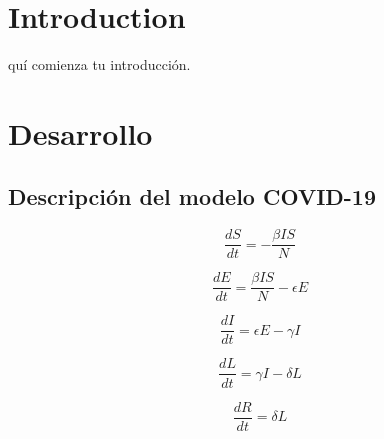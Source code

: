 \documentclass[journal]{IEEEtran}
\begin{document}
%
\IEEEpeerreviewmaketitle



\section{Introduction}


quí comienza tu introducción.



\section{Desarrollo}


\subsection{Descripción del modelo COVID-19}
\begin{equation}
    \frac{dS}{dt} = -\frac{\beta IS}{N}
\end{equation}

\begin{equation}
    \frac{dE}{dt} = \frac{\beta IS}{N} - \epsilon E
\end{equation}

\begin{equation}
    \frac{dI}{dt} = \epsilon E - \gamma I
\end{equation}

\begin{equation}
    \frac{dL}{dt} = \gamma I - \delta L
\end{equation}

\begin{equation}
    \frac{dR}{dt} = \delta L
\end{equation}
\end{document}
